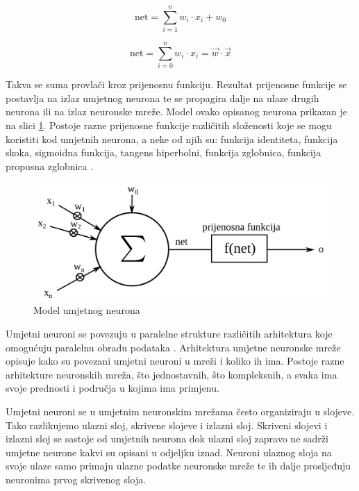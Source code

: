 \documentclass[zavrsnirad]{fer}
\begin{document}
	\begin{equation}
		\label{net}
		\text{net} = \sum_{i=1}^{n} w_i \cdot x_i + w_0
	\end{equation}
	
	\begin{equation}
		\label{konacanNet}
		\text{net} = \sum_{i=0}^{n} w_i \cdot x_i = \vec{w} \cdot \vec{x}
	\end{equation}
	
	Takva se suma provlači kroz prijenosnu funkciju. Rezultat prijenosne funkcije se postavlja na izlaz umjetnog neurona te se propagira dalje na ulaze drugih neurona ili na izlaz neuronske mreže. Model ovako opisanog neurona prikazan je na slici \ref{modelUmjetnogNeurona}. Postoje razne prijenosne funkcije različitih složenosti koje se mogu koristiti kod umjetnih neurona, a neke od njih su: funkcija identiteta, funkcija skoka, sigmoidna funkcija, tangens hiperbolni, funkcija zglobnica, funkcija propusna zglobnica \cite{skriptaNeuronskeMreze}.
	
	\begin{figure}[htb]
		\centering
		\includegraphics[width=\textwidth]{Extra/modelUmjetnogNeurona.png} 
		\caption{Model umjetnog neurona}
		\label{modelUmjetnogNeurona}
	\end{figure}
	
	Umjetni neuroni se povezuju u paralelne strukture različitih arhitektura koje omogućuju paralelnu obradu podataka \cite{skriptaNeuronskeMreze}. Arhitektura umjetne neuronske mreže opisuje kako su povezani umjetni neuroni u mreži i koliko ih ima. Postoje razne arhitekture neuronskih mreža, što jednostavnih, što kompleksnih, a svaka ima svoje prednosti i područja u kojima ima primjenu.
	
	Umjetni neuroni se u umjetnim neuronskim mrežama često organiziraju u slojeve. Tako razlikujemo ulazni sloj, skrivene slojeve i izlazni sloj. Skriveni slojevi i izlazni sloj se sastoje od umjetnih neurona dok ulazni sloj zapravo ne sadrži umjetne neurone kakvi su opisani u odjeljku iznad. Neuroni ulaznog sloja na svoje ulaze samo primaju ulazne podatke neuronske mreže te ih dalje prosljeđuju neuronima prvog skrivenog sloja.
	
\end{document}
